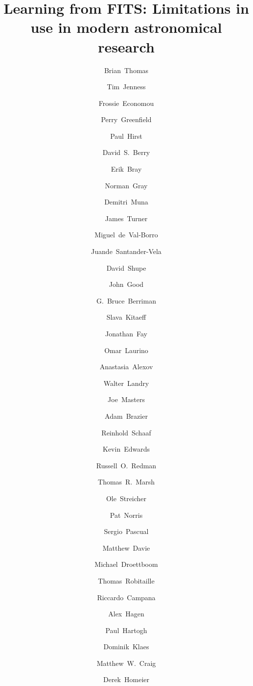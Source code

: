 \documentclass[final,authoryear,5p,times,twocolumn]{elsarticle}
\begin{document}
\begin{frontmatter}



\title{Learning from FITS: Limitations in use in modern astronomical research}


\author[noao]{Brian~Thomas}
\author[cornell]{Tim~Jenness}
\author[noao]{Frossie~Economou}
\author[stsci]{Perry~Greenfield}
\author[geminin]{Paul~Hirst}
\author[jac]{David~S.~Berry}
\author[stsci]{Erik~Bray}
\author[glasgow]{Norman~Gray}
\author[ohio]{Demitri~Muna}
\author[geminis]{James~Turner}
\author[princeton]{Miguel~de~Val-Borro}
\author[iaa,ska]{Juande~Santander-Vela}
\author[ipac]{David~Shupe}
\author[ipac]{John~Good}
\author[ipac]{G.~Bruce~Berriman}
\author[icrar]{Slava~Kitaeff}
\author[microsoft]{Jonathan~Fay}
\author[sao]{Omar~Laurino}
\author[stsci]{Anastasia~Alexov}
\author[ipac]{Walter~Landry}
\author[nrao]{Joe~Masters}
\author[cornell]{Adam~Brazier}
\author[aifa]{Reinhold~Schaaf}
\author[uwaterloo]{Kevin~Edwards}
\author[jac]{Russell~O.~Redman}
\author[warwick]{Thomas~R.~Marsh}
\author[aip]{Ole~Streicher}
\author[noao]{Pat~Norris}
\author[ucm]{Sergio~Pascual}
\author[unsw]{Matthew~Davie}
\author[stsci]{Michael~Droettboom}
\author[mpia]{Thomas~Robitaille}
\author[iasf]{Riccardo~Campana}
\author[psu]{Alex~Hagen}
\author[mps]{Paul~Hartogh}
\author[aifa]{Dominik~Klaes}
\author[msum]{Matthew~W.~Craig}
\author[cral]{Derek~Homeier}



\end{frontmatter}
\end{document}
